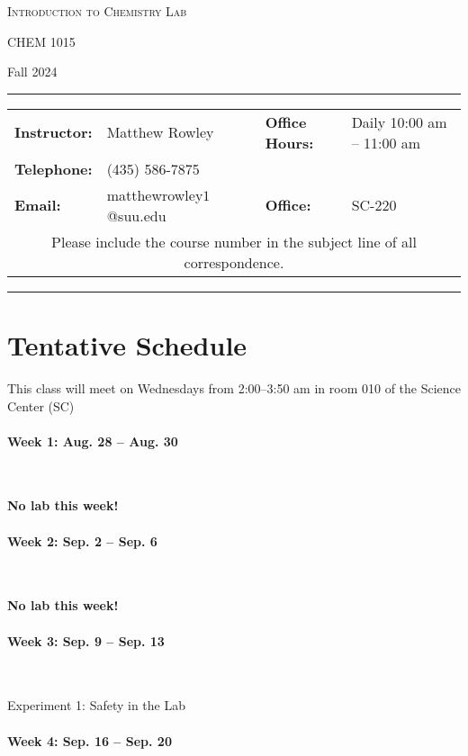 \documentclass[12pt, letterpaper]{article}
\begin{document}
\begin{center}
	{\Large \textsc{Introduction to Chemistry Lab}}

	CHEM 1015
\end{center}

\begin{center}
	{\large Fall 2024}
\end{center}
\begin{center}
	\rule{0.99\textwidth}{0.4pt}
	\begin{tabular}{llcll}
		\textbf{Instructor:} & Matthew Rowley           &  & \textbf{Office Hours:} & Daily 10:00 am -- 11:00 am \\
		\textbf{Telephone:}  & (435) 586-7875           &  &                        &  \\
		\textbf{Email:}      & matthewrowley$1$@suu.edu &  & \textbf{Office:}       & SC-220                   \\
		\multicolumn{5}{c}{Please include the course number in the subject line of all correspondence.}
	\end{tabular}
	\rule{0.99\textwidth}{0.4pt}
\end{center}

\section*{Tentative Schedule}
This class will meet on Wednesdays from 2:00--3:50 am in room 010 of the Science Center (SC)

\paragraph{Week 1: Aug. 28 -- Aug. 30}~

\textbf{No lab this week!}

\paragraph{Week 2: Sep. 2 -- Sep. 6}~

\textbf{No lab this week!}

\paragraph{Week 3: Sep. 9 -- Sep. 13}~

Experiment 1: Safety in the Lab

\paragraph{Week 4: Sep. 16 -- Sep. 20}~
\end{document}
